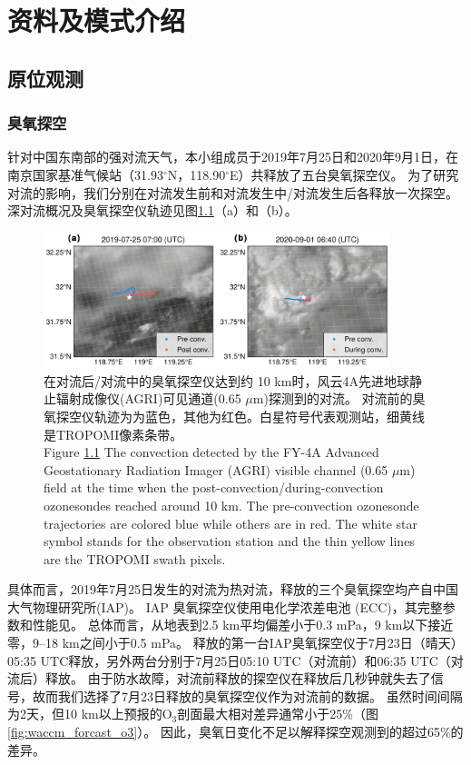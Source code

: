 
\chapter{资料及模式介绍}

\section{原位观测}

\subsection{臭氧探空}

针对中国东南部的强对流天气，本小组成员于2019年7月25日和2020年9月1日，在南京国家基准气候站（31.93$^{\circ}$N，118.90$^{\circ}$E）共释放了五台臭氧探空仪。
为了研究对流的影响，我们分别在对流发生前和对流发生中/对流发生后各释放一次探空。
深对流概况及臭氧探空仪轨迹见图\ref{fig:ozonesonde}（a）和（b）。

\begin{figure}[htbp]
\centering
\includegraphics[width=0.9\textwidth]{./figures/ozonesonde.png}
\caption{在对流后/对流中的臭氧探空仪达到约 10 km时，风云4A先进地球静止辐射成像仪(AGRI)可见通道(0.65 $\mu$m)探测到的对流。
对流前的臭氧探空仪轨迹为为蓝色，其他为红色。白星符号代表观测站，细黄线是TROPOMI像素条带。\\
Figure \ref{fig:ozonesonde} The convection detected by the FY-4A Advanced Geostationary Radiation Imager (AGRI)
visible channel (0.65 $\mu$m) field at the time when the post-convection/during-convection ozonesondes reached around 10 km.
The pre-convection ozonesonde trajectories are colored blue while others are in red.
The white star symbol stands for the observation station and the thin yellow lines are the TROPOMI swath pixels.
}
\label{fig:ozonesonde}
\end{figure}


具体而言，2019年7月25日发生的对流为热对流，释放的三个臭氧探空均产自中国大气物理研究所(IAP)。
IAP 臭氧探空仪使用电化学浓差电池 (ECC)，其完整参数和性能见\citet{Zhang.2014}。
总体而言，从地表到2.5 km平均偏差小于0.3 mPa，9 km以下接近零，9--18 km之间小于0.5 mPa。
释放的第一台IAP臭氧探空仪于7月23日（晴天）05:35 UTC释放，另外两台分别于7月25日05:10 UTC（对流前）和06:35 UTC（对流后）释放。
由于防水故障，对流前释放的探空仪在释放后几秒钟就失去了信号，故而我们选择了7月23日释放的臭氧探空仪作为对流前的数据。
虽然时间间隔为2天，但10 km以上预报的O$_3$剖面最大相对差异通常小于25\%（图\ref{fig:waccm_forcast_o3}）。
因此，臭氧日变化不足以解释探空观测到的超过65\%的差异。

